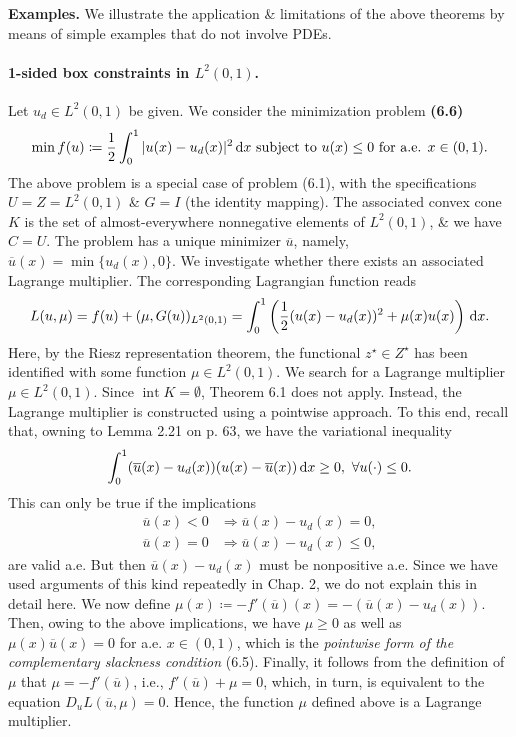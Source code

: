 \documentclass[oneside]{book}
\numberwithin{equation}{section}
\begin{document}
\textbf{Examples.} We illustrate the application \& limitations of the above theorems by means of simple examples that do not involve PDEs.

\paragraph{1-sided box constraints in $L^2(0,1)$.} Let $u_d\in L^2(0,1)$ be given. We consider the minimization problem \textbf{(6.6)}
\begin{align*}
	\min f(u)\coloneqq\frac{1}{2}\int_0^1 |u(x) - u_d(x)|^2\,{\rm d}x\mbox{ subject to } u(x)\le 0\mbox{ for a.e. } x\in(0,1).
\end{align*}
The above problem is a special case of problem (6.1), with the specifications $U = Z = L^2(0,1)$ \& $G = I$ (the identity mapping). The associated convex cone $K$ is the set of almost-everywhere nonnegative elements of $L^2(0,1)$, \& we have $C = U$. The problem has a unique minimizer $\overline{u}$, namely, $\overline{u}(x) = \min\{u_d(x),0\}$. We investigate whether there exists an associated Lagrange multiplier. The corresponding Lagrangian function reads
\begin{align*}
	L(u,\mu) = f(u) + (\mu,G(u))_{L^2(0,1)} = \int_0^1 \left(\frac{1}{2}(u(x) - u_d(x))^2 + \mu(x)u(x)\right)\,{\rm d}x.
\end{align*}
Here, by the Riesz representation theorem, the functional $z^\star\in Z^\star$ has been identified with some function $\mu\in L^2(0,1)$. We search for a Lagrange multiplier $\mu\in L^2(0,1)$. Since $\operatorname{int}K = \emptyset$, Theorem 6.1 does not apply. Instead, the Lagrange multiplier is constructed using a pointwise approach. To this end, recall that, owning to Lemma 2.21 on p. 63, we have the variational inequality
\begin{align*}
	\int_0^1 (\overline{u}(x) - u_d(x))(u(x) - \overline{u}(x))\,{\rm d}x\ge 0,\ \forall u(\cdot)\le 0.
\end{align*}
This can only be true if the implications
\begin{align*}
	\overline{u}(x) < 0&\Rightarrow\overline{u}(x) - u_d(x) = 0,\\
	\overline{u}(x) = 0&\Rightarrow\overline{u}(x) - u_d(x)\le 0,
\end{align*}
are valid a.e. But then $\overline{u}(x) - u_d(x)$ must be nonpositive a.e. Since we have used arguments of this kind repeatedly in Chap. 2, we do not explain this in detail here. We now define $\mu(x)\coloneqq-f'(\overline{u})(x) = -(\overline{u}(x) - u_d(x))$. Then, owing to the above implications, we have $\mu\ge 0$ as well as $\mu(x)\overline{u}(x) = 0$ for a.e. $x\in(0,1)$, which is the \textit{pointwise form of the complementary slackness condition} (6.5). Finally, it follows from the definition of $\mu$ that $\mu = -f'(\overline{u})$, i.e., $f'(\overline{u}) + \mu = 0$, which, in turn, is equivalent to the equation $D_uL(\overline{u},\mu) = 0$. Hence, the function $\mu$ defined above is a Lagrange multiplier.
\end{document}
